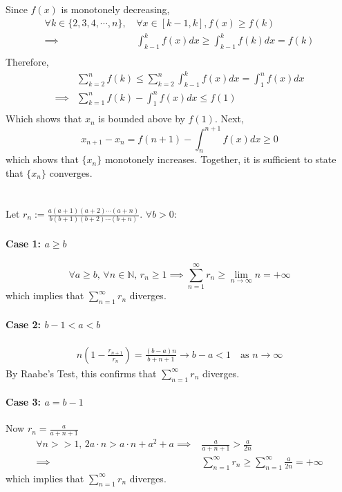 \documentclass{article}
\begin{document}
\section{}
Since $f(x)$ is monotonely decreasing,
$$\begin{aligned}
    \forall k \in \{ 2,3,4, \cdots, n \} ,\, &\forall x \in [k-1,k], f(x) \ge f(k) \\
    \implies &\int _{k-1}^{k} f(x) dx \ge \int _{k-1}^{k} f(k) dx = f(k) \\
\end{aligned}$$
Therefore,
$$\begin{aligned}
    &\sum _{k=2}^{n} f(k) \le \sum _{k=2}^{n} \int _{k-1}^{k} f(x) dx = \int_1^n f(x) dx \\
    \implies &\sum _{k=1}^{n} f(k) - \int _1^n f(x) dx \le f(1) \\
\end{aligned}$$
Which shows that $x_n$ is bounded above by $f(1)$. Next,
$$x_{n+1} - x_n = f(n+1) - \int _n^{n+1} f(x) dx \ge 0 $$
which shows that $\{x_n\}$ monotonely increases. Together, it is sufficient to state that $\{x_n\}$ converges.

\section{}
Let $r_n := \frac{a(a+1)(a+2)\cdots (a+n)}{b(b+1)(b+2)\cdots (b+n)}$. $\forall b>0$:

\paragraph{Case 1: $a\ge b$}
$$\forall a \ge b ,\, \forall n \in \mathbb{N} ,\, r_n \ge 1 \implies \sum_{n=1}^{\infty} r_n \ge \lim_{n\to\infty} n = +\infty$$
which implies that $\sum_{n=1}^{\infty} r_n$ diverges.

\paragraph{Case 2: $b-1<a<b$}
$$\begin{aligned}
    n\left(1-\frac{r_{n+1}}{r_n}\right) = \frac{(b-a)n}{b+n+1} \to b-a < 1 \quad \text{as } n\to\infty
\end{aligned}$$
By Raabe's Test, this confirms that $\sum_{n=1}^{\infty} r_n$ diverges.

\paragraph{Case 3: $a=b-1$}
Now $r_n = \frac{a}{a+n+1}$
$$\begin{aligned}
    \forall n>>1,\, 2a\cdot n > a\cdot n+a^2+a \implies &\frac{a}{a+n+1} > \frac{a}{2n} \\
    \implies &\sum_{n=1}^{\infty} r_n \ge \sum_{n=1}^{\infty} \frac{a}{2n} = +\infty
\end{aligned}$$
which implies that $\sum_{n=1}^{\infty} r_n$ diverges.
\end{document}

